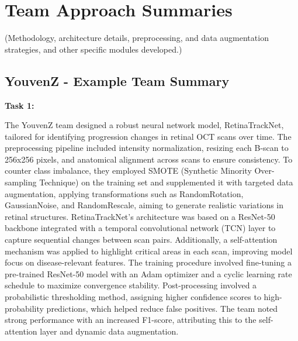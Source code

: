 \documentclass{article}
\begin{document}
\begin{table}[h!]
\centering
{}
\end{table}

\section{Team Approach Summaries}

(Methodology, architecture details, preprocessing, and data augmentation strategies, and other specific modules developed.)

\subsection{YouvenZ - Example Team Summary}

\textbf{Task 1:}

The YouvenZ team designed a robust neural network model, RetinaTrackNet, tailored for identifying progression changes in retinal OCT scans over time. The preprocessing pipeline included intensity normalization, resizing each B-scan to 256x256 pixels, and anatomical alignment across scans to ensure consistency. To counter class imbalance, they employed SMOTE (Synthetic Minority Over-sampling Technique) on the training set and supplemented it with targeted data augmentation, applying transformations such as RandomRotation, GaussianNoise, and RandomRescale, aiming to generate realistic variations in retinal structures.
RetinaTrackNet’s architecture was based on a ResNet-50 backbone integrated with a temporal convolutional network (TCN) layer to capture sequential changes between scan pairs. Additionally, a self-attention mechanism was applied to highlight critical areas in each scan, improving model focus on disease-relevant features. The training procedure involved fine-tuning a pre-trained ResNet-50 model with an Adam optimizer and a cyclic learning rate schedule to maximize convergence stability. Post-processing involved a probabilistic thresholding method, assigning higher confidence scores to high-probability predictions, which helped reduce false positives. The team noted strong performance with an increased F1-score, attributing this to the self-attention layer and dynamic data augmentation.
\end{document}
